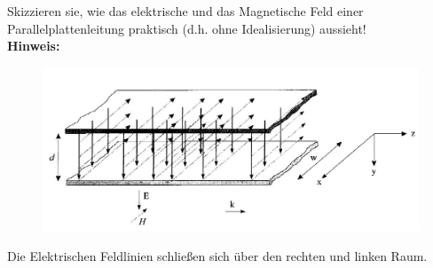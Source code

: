 \begin{question}[section=3,name={Feldbild},difficulty=,quantity=1,type=thr,tags={}]
	Skizzieren sie, wie das elektrische und das Magnetische Feld einer Parallelplattenleitung praktisch (d.h. ohne Idealisierung) aussieht! 
	\\ \textbf{Hinweis:}\\
	
\end{question}
\begin{solution}
	\begin{figure}[H]
		\includegraphics[width=14cm]{./opn/exm/thr/chp/3/1/bild.jpeg}
	\end{figure}
	Die Elektrischen Feldlinien schließen sich über den rechten und linken Raum.
\end{solution}